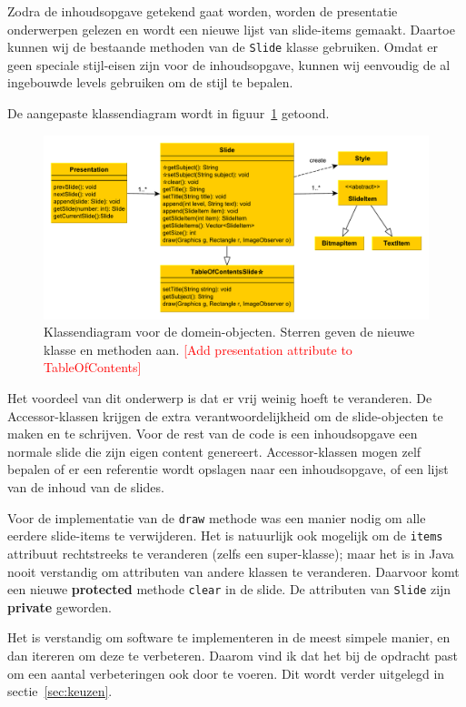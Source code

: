 \documentclass[a4paper]{article}
\newcommand{\todo}[1]{\textcolor{red}{[#1]}\\}
\newcommand{\code}[1]{\lstinline[columns=fixed]{#1}}
\begin{document}
    Zodra de inhoudsopgave getekend gaat worden, worden de presentatie onderwerpen gelezen en wordt een nieuwe lijst van slide-items gemaakt.
    Daartoe kunnen wij de bestaande methoden van de \code{Slide} klasse gebruiken.
    Omdat er geen speciale stijl-eisen zijn voor de inhoudsopgave, kunnen wij eenvoudig de al ingebouwde levels gebruiken om de stijl te bepalen.

    De aangepaste klassendiagram wordt in figuur~\ref{fig:design} getoond.
    \begin{figure}[!htb]
     \caption{
        Klassendiagram voor de domein-objecten.\label{fig:design}
        Sterren geven de nieuwe klasse en methoden aan.
        \todo{Add presentation attribute to TableOfContents}
     }
     \centering \includegraphics[width=\textwidth]{Diagrams/design.pdf}
    \end{figure}

    Het voordeel van dit onderwerp is dat er vrij weinig hoeft te veranderen.
    De Accessor-klassen krijgen de extra verantwoordelijkheid om de slide-objecten te maken en te schrijven.
    Voor de rest van de code is een inhoudsopgave een normale slide die zijn eigen content genereert.
    Accessor-klassen mogen zelf bepalen of er een referentie wordt opslagen naar een inhoudsopgave, of een lijst van de inhoud van de slides.

    Voor de implementatie van de \code{draw} methode was een manier nodig om alle eerdere slide-items te verwijderen.
    Het is natuurlijk ook mogelijk om de \code{items} attribuut rechtstreeks te veranderen (zelfs een super-klasse);
    maar het is in Java nooit verstandig om attributen van andere klassen te veranderen.
    Daarvoor komt een nieuwe \textbf{protected} methode \code{clear} in de slide.
    De attributen van \code{Slide} zijn \textbf{private} geworden.

    Het is verstandig om software te implementeren in de meest simpele manier, en dan itereren om deze te verbeteren.
    Daarom vind ik dat het bij de opdracht past om een aantal verbeteringen ook door te voeren.
    Dit wordt verder uitgelegd in sectie~\ref{sec:keuzen}.
\end{document}
